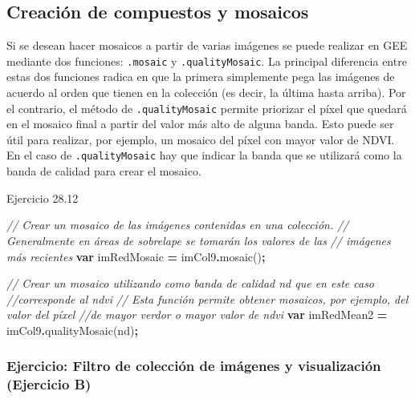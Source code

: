 \documentclass[
  12pt,
  letterpaper,
  twoside]{book}
\newenvironment{Shaded}{\begin{snugshade}}{\end{snugshade}}
\newcommand{\CommentTok}[1]{\textcolor[rgb]{0.56,0.35,0.01}{\textit{#1}}}
\newcommand{\FunctionTok}[1]{\textcolor[rgb]{0.00,0.00,0.00}{#1}}
\newcommand{\KeywordTok}[1]{\textcolor[rgb]{0.13,0.29,0.53}{\textbf{#1}}}
\newcommand{\NormalTok}[1]{#1}
\newcommand{\OperatorTok}[1]{\textcolor[rgb]{0.81,0.36,0.00}{\textbf{#1}}}
\newcommand{\StringTok}[1]{\textcolor[rgb]{0.31,0.60,0.02}{#1}}
\begin{document}
\hypertarget{creaciuxf3n-de-compuestos-y-mosaicos}{%
\subsection{Creación de compuestos y mosaicos}\label{creaciuxf3n-de-compuestos-y-mosaicos}}

Si se desean hacer mosaicos a partir de varias imágenes se puede realizar en GEE mediante dos funciones: \texttt{.mosaic} y \texttt{.qualityMosaic}. La principal diferencia entre estas dos funciones radica en que la primera simplemente pega las imágenes de acuerdo al orden que tienen en la colección (es decir, la última hasta arriba). Por el contrario, el método de \texttt{.qualityMosaic} permite priorizar el píxel que quedará en el mosaico final a partir del valor más alto de alguna banda. Esto puede ser útil para realizar, por ejemplo, un mosaico del píxel con mayor valor de NDVI. En el caso de \texttt{.qualityMosaic} hay que indicar la banda que se utilizará como la banda de calidad para crear el mosaico.

Ejercicio 28.12

\begin{Shaded}
\begin{Highlighting}[]
\CommentTok{// Crear un mosaico de las imágenes contenidas en una colección. }
\CommentTok{// Generalmente en áreas de sobrelape se tomarán los valores de las }
\CommentTok{// imágenes más recientes}
\KeywordTok{var}\NormalTok{ imRedMosaic }\OperatorTok{=}\NormalTok{ imCol9}\OperatorTok{.}\FunctionTok{mosaic}\NormalTok{()}\OperatorTok{;}

\CommentTok{// Crear un mosaico utilizando como banda de calidad \textquotesingle{}nd\textquotesingle{} que en este caso}
\CommentTok{//corresponde al ndvi}
\CommentTok{// Esta función permite obtener mosaicos, por ejemplo, del valor del píxel}
\CommentTok{//de mayor verdor o mayor valor de ndvi}
\KeywordTok{var}\NormalTok{ imRedMean2 }\OperatorTok{=}\NormalTok{ imCol9}\OperatorTok{.}\FunctionTok{qualityMosaic}\NormalTok{(}\StringTok{\textquotesingle{}nd\textquotesingle{}}\NormalTok{)}\OperatorTok{;}
\end{Highlighting}
\end{Shaded}

\hypertarget{ejercicio-filtro-de-colecciuxf3n-de-imuxe1genes-y-visualizaciuxf3n-ejercicio-b}{%
\subsubsection{Ejercicio: Filtro de colección de imágenes y visualización (Ejercicio B)}\label{ejercicio-filtro-de-colecciuxf3n-de-imuxe1genes-y-visualizaciuxf3n-ejercicio-b}}
\end{document}
